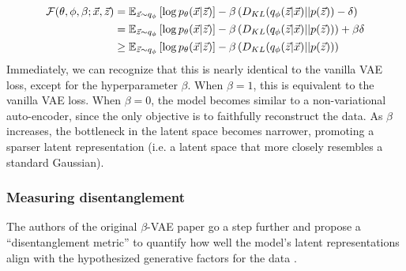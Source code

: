 \begin{align*}
    \mathcal{F}(\theta, \phi, \beta; \vec{x}, \vec{z}) &= \mathbb{E}_{\vec{z}\sim q_\phi}\left[ \log p_\theta(\vec{x}|\vec{z}) \right] - \beta\left( D_{KL}(q_\phi(\vec{z}|\vec{x})||p(\vec{z})) - \delta \right) \\
    &= \mathbb{E}_{\vec{z}\sim q_\phi}\left[ \log p_\theta(\vec{x}|\vec{z}) \right] - \beta\left( D_{KL}(q_\phi(\vec{z}|\vec{x})||p(\vec{z}))\right) + \beta\delta \\
    &\geq \mathbb{E}_{\vec{z}\sim q_\phi}\left[ \log p_\theta(\vec{x}|\vec{z}) \right] - \beta\left( D_{KL}(q_\phi(\vec{z}|\vec{x})||p(\vec{z}))\right)
\end{align*}
Immediately, we can recognize that this is nearly identical to the vanilla VAE loss, except for the hyperparameter $\beta$. When $\beta=1$, this is equivalent to the vanilla VAE loss. When $\beta = 0$, the model becomes similar to a non-variational auto-encoder, since the only objective is to faithfully reconstruct the data. As $\beta$ increases, the bottleneck in the latent space becomes narrower, promoting a sparser latent representation (i.e. a latent space that more closely resembles a standard Gaussian).

\subsubsection{Measuring disentanglement}

The authors of the original $\beta$-VAE paper go a step further and propose a ``disentanglement metric'' to quantify how well the model's latent representations align with the hypothesized generative factors for the data \cite{higgins2016beta}.

